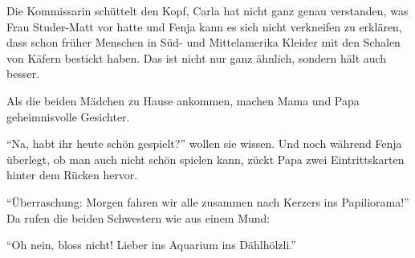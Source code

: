 Die Kommissarin schüttelt den Kopf, Carla hat nicht ganz genau verstanden, was Frau Studer-Matt vor hatte und Fenja kann es sich nicht verkneifen zu erklären, dass schon früher Menschen in Süd- und Mittelamerika Kleider mit den Schalen von Käfern bestickt haben. Das ist nicht nur ganz ähnlich, sondern hält auch besser. 

Als die beiden Mädchen zu Hause ankommen, machen Mama und Papa geheimnisvolle Gesichter. 

\enquote{Na, habt ihr heute schön gespielt?} wollen sie wissen. Und noch während Fenja überlegt, ob man auch nicht schön spielen kann, zückt Papa zwei Eintrittskarten hinter dem Rücken hervor.

\enquote{Überraschung: Morgen fahren wir alle zusammen nach Kerzers ins Papiliorama!} Da rufen die beiden Schwestern wie aus einem Mund:

\enquote{Oh nein, bloss nicht! Lieber ins Aquarium ins Dählhölzli.} \hfill {\color{red}\decofourleft}
